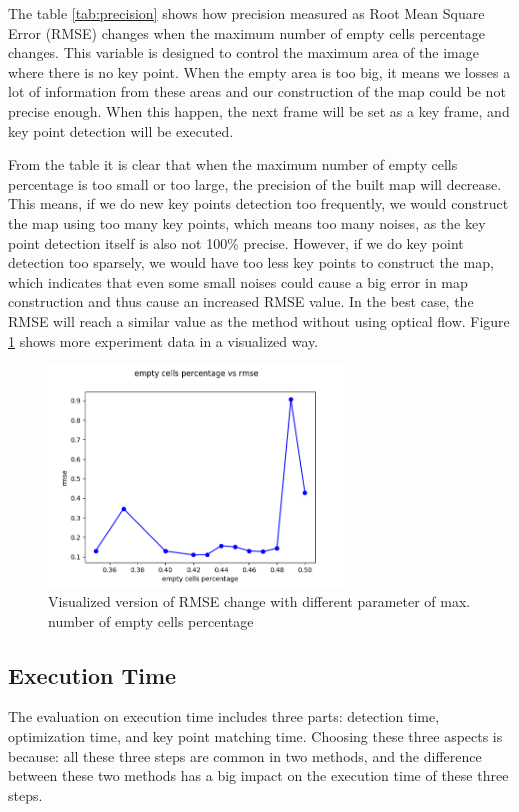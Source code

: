\documentclass{easychair}
\begin{document}
The table \ref{tab:precision} shows how precision measured as Root Mean Square Error (RMSE) changes when the maximum number of empty cells percentage changes. This variable is designed to control the maximum area of the image where there is no key point. When the empty area is too big, it means we losses a lot of information from these areas and our construction of the map could be not precise enough. When this happen, the next frame will be set as a key frame, and key point detection will be executed. 

From the table it is clear that when the maximum number of empty cells percentage is too small or too large, the precision of the built map will decrease. This means, if we do new key points detection too frequently, we would construct the map using too many key points, which means too many noises, as the key point detection itself is also not 100\% precise. However, if we do key point detection too sparsely, we would have too less key points to construct the map, which indicates that even some small noises could cause a big error in map construction and thus cause an increased RMSE value. In the best case, the RMSE will reach a similar value as the method without using optical flow. Figure \ref{fig:max_empty_cell} shows more experiment data in a visualized way.

\begin{figure}
	\label{fig:max_empty_cell}
	\centering
	\includegraphics[width=0.7\textwidth]{img/max_num_empty_cell1.png}
	\caption{Visualized version of RMSE change with different parameter of max. number of empty cells percentage}
\end{figure}


\subsection{Execution Time}
The evaluation on execution time includes three parts: detection time, optimization time, and key point matching time. Choosing these three aspects is because: all these three steps are common in two methods, and the difference between these two methods has a big impact on the execution time of these three steps.
\end{document}
